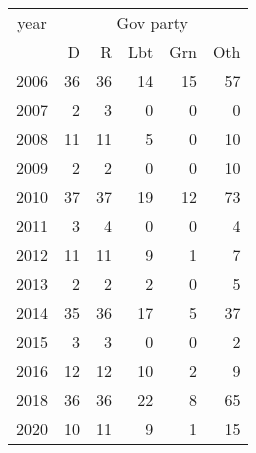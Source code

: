 \footnotesize\begin{tabular}[t]{lrrrrr}
\toprule
\multicolumn{1}{c}{year} & \multicolumn{5}{c}{Gov party} \\
\cmidrule(l{3pt}r{3pt}){1-1} \cmidrule(l{3pt}r{3pt}){2-6}
  & D & R & Lbt & Grn & Oth\\
\midrule
2006 & 36 & 36 & 14 & 15 & 57\\
2007 & 2 & 3 & 0 & 0 & 0\\
2008 & 11 & 11 & 5 & 0 & 10\\
2009 & 2 & 2 & 0 & 0 & 10\\
2010 & 37 & 37 & 19 & 12 & 73\\
2011 & 3 & 4 & 0 & 0 & 4\\
2012 & 11 & 11 & 9 & 1 & 7\\
2013 & 2 & 2 & 2 & 0 & 5\\
2014 & 35 & 36 & 17 & 5 & 37\\
2015 & 3 & 3 & 0 & 0 & 2\\
2016 & 12 & 12 & 10 & 2 & 9\\
2018 & 36 & 36 & 22 & 8 & 65\\
2020 & 10 & 11 & 9 & 1 & 15\\
\bottomrule
\end{tabular}
